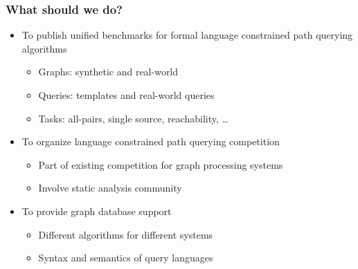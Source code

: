 \documentclass[xcolor=table,aspectratio=169]{beamer}
\begin{document}
\begin{frame}[fragile]
  \frametitle{What should we do?}
  \begin{itemize}
    \item[\faRoad] To publish unified benchmarks for formal language constrained path querying algorithms
    \begin{itemize}
      \item Graphs: synthetic and real-world
      \item Queries: templates and real-world queries
      \item Tasks: all-pairs, single source, reachability, \ldots            
    \end{itemize}
    \pause
    \item[\faRoad] To organize language constrained path querying competition
    \begin{itemize}
      \item Part of existing competition for graph processing systems
      \item Involve static analysis community
    \end{itemize}
    \pause
    \item[\faRoute] To provide graph database support
    \begin{itemize}
      \item Different algorithms for different systems
      \item Syntax and semantics of query languages 
    \end{itemize}
  \end{itemize}
\end{frame}
\end{document}
